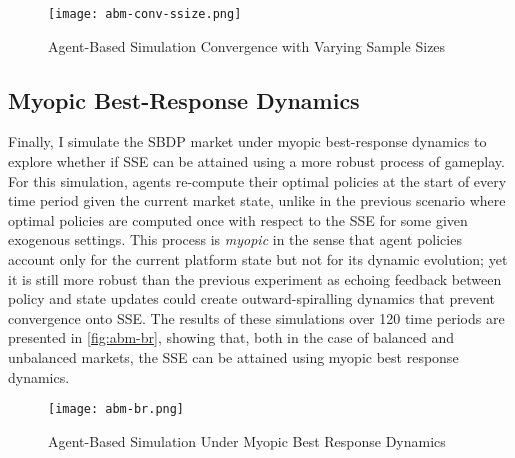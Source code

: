 \begin{figure}[ht] 
    \centering
    \caption{Agent-Based Simulation Convergence with Varying Sample Sizes}
    \texttt{[image: abm-conv-ssize.png]}
    \label{fig:abm-conv-ssize}
\end{figure} 

\subsection{Myopic Best-Response Dynamics}
Finally, I simulate the SBDP market under myopic best-response dynamics \citep{fudenberg1998theory} to explore whether if SSE can be attained using a more robust process of gameplay. 
For this simulation, agents re-compute their optimal policies at the start of every time period given the current market state, unlike in the previous scenario where optimal policies are computed once with respect to the SSE for some given exogenous settings. 
This process is \textit{myopic} in the sense that agent policies account only for the current platform state but not for its dynamic evolution; yet it is still more robust than the previous experiment as echoing feedback between policy and state updates could create outward-spiralling dynamics that prevent convergence onto SSE. 
The results of these simulations over 120 time periods are presented in \autoref{fig:abm-br}, showing that, both in the case of balanced and unbalanced markets, the SSE can be attained using myopic best response dynamics.

\begin{figure}[ht] 
    \centering
    \caption{Agent-Based Simulation Under Myopic Best Response Dynamics}
    \texttt{[image: abm-br.png]}
    \label{fig:abm-br}
\end{figure}   